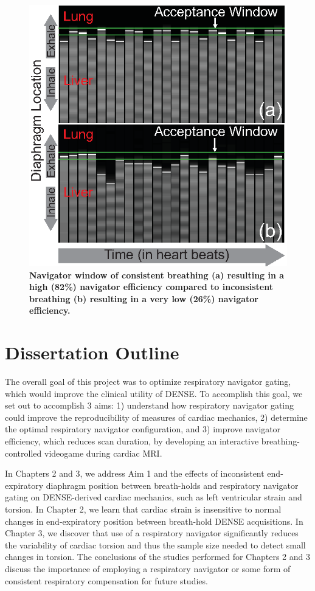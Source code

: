 	\begin{figure}
		\centering
		\includegraphics{figures/intro/goodvsbadbreathingpatterns}
		\caption[Consistent vs Inconsistent Breathing]{\textbf{Navigator window of consistent breathing (a) resulting in a high (82\%) navigator efficiency compared to inconsistent breathing (b) resulting in a very low (26\%) navigator efficiency.}}
		\label{fig:good_vs_bad_breathing}
	\end{figure}

\section{Dissertation Outline}
	The overall goal of this project was to optimize respiratory navigator gating, which would improve the clinical utility of DENSE. To accomplish this goal, we set out to accomplish 3 aims: 1) understand how respiratory navigator gating could improve the reproducibility of measures of cardiac mechanics, 2) determine the optimal respiratory navigator configuration, and 3) improve navigator efficiency, which reduces scan duration, by developing an interactive breathing-controlled videogame during cardiac MRI.
	
	\indent In Chapters 2 and 3, we address Aim 1 and the effects of inconsistent end-expiratory diaphragm position between breath-holds and respiratory navigator gating on DENSE-derived cardiac mechanics, such as left ventricular strain and torsion. In Chapter 2, we learn that cardiac strain is insensitive to normal changes in end-expiratory position between breath-hold DENSE acquisitions. In Chapter 3, we discover that use of a respiratory navigator significantly reduces the variability of cardiac torsion and thus the sample size needed to detect small changes in torsion. The conclusions of the studies performed for Chapters 2 and 3 discuss the importance of employing a respiratory navigator or some form of consistent respiratory compensation for future studies.
	
